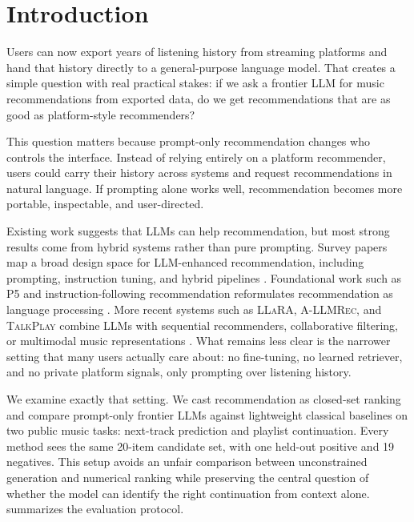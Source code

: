 \section{Introduction}
\label{sec:intro}

Users can now export years of listening history from streaming platforms and hand that history directly to a general-purpose language model. That creates a simple question with real practical stakes: if we ask a frontier LLM for music recommendations from exported data, do we get recommendations that are as good as platform-style recommenders?

This question matters because prompt-only recommendation changes who controls the interface. Instead of relying entirely on a platform recommender, users could carry their history across systems and request recommendations in natural language. If prompting alone works well, recommendation becomes more portable, inspectable, and user-directed.

Existing work suggests that LLMs can help recommendation, but most strong results come from hybrid systems rather than pure prompting. Survey papers map a broad design space for LLM-enhanced recommendation, including prompting, instruction tuning, and hybrid pipelines \cite{wu2023survey,zhao2023era}. Foundational work such as P5 and instruction-following recommendation reformulates recommendation as language processing \cite{geng2022p5,zhang2023instruction}. More recent systems such as \textsc{LLaRA}, \textsc{A-LLMRec}, and \textsc{TalkPlay} combine LLMs with sequential recommenders, collaborative filtering, or multimodal music representations \cite{liao2024llara,kim2024allmrec,doh2025talkplay}. What remains less clear is the narrower setting that many users actually care about: no fine-tuning, no learned retriever, and no private platform signals, only prompting over listening history.

We examine exactly that setting. We cast recommendation as closed-set ranking and compare prompt-only frontier LLMs against lightweight classical baselines on two public music tasks: \lastfm next-track prediction and \mpd playlist continuation. Every method sees the same 20-item candidate set, with one held-out positive and 19 negatives. This setup avoids an unfair comparison between unconstrained generation and numerical ranking while preserving the central question of whether the model can identify the right continuation from context alone.  summarizes the evaluation protocol.

